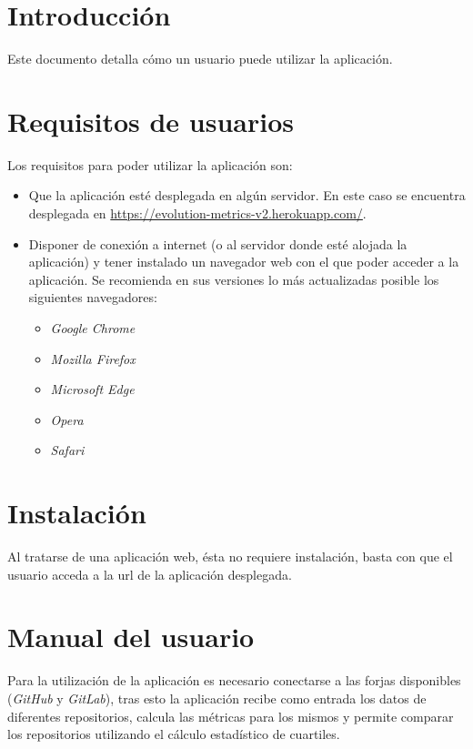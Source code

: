 \label{anex:D}

\section{Introducción}
Este documento detalla cómo un usuario puede utilizar la aplicación.
\section{Requisitos de usuarios}
Los requisitos para poder utilizar la aplicación son:
\begin{itemize}
	\tightlist
	\item Que la aplicación esté desplegada en algún servidor. En este caso se encuentra desplegada en \url{https://evolution-metrics-v2.herokuapp.com/}.
	\item Disponer de conexión a internet (o al servidor donde esté alojada la aplicación) y tener instalado un navegador web con el que poder acceder a la aplicación. Se recomienda en sus versiones lo más actualizadas posible los siguientes navegadores:
	\begin{itemize}
		\tightlist
		\item \textit{Google Chrome}
		\item \textit{Mozilla Firefox}
		\item \textit{Microsoft Edge}
		\item \textit{Opera}
		\item \textit{Safari}
	\end{itemize}
\end{itemize}

\section{Instalación}
Al tratarse de una aplicación web, ésta no requiere instalación, basta con que el usuario acceda a la url de la aplicación desplegada.

\section{Manual del usuario}
Para la utilización de la aplicación es necesario conectarse a las forjas disponibles (\textit{GitHub} y \textit{GitLab}), tras esto la aplicación recibe como entrada los datos de diferentes repositorios, calcula las métricas para los mismos y permite comparar los repositorios utilizando el cálculo estadístico de cuartiles.

